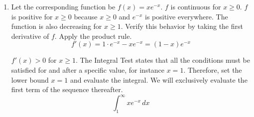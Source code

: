 \documentclass[a4paper, 12pt]{article}
\begin{document}
\begin{enumerate}[leftmargin=*,label=\textbf{\arabic*.}]
Find the antiderivative of $\sec^3t$ with the help of integration by parts.
\begin{align*}
    w=\sec t\,&\rightarrow\, dw = \sec t\tan t \,dt\\
    dz=\sec^2t\,dt\,&\rightarrow\, z = \tan t
\end{align*}
\vspace{-2em}
\begin{align*}
\int\sec^3t\,du&=\tan t\cdot\sec t-\int\tan^2 t\sec t\,dt=\tan t\cdot\sec t-\int\frac{1-\cos^2t}{\cos^3 t}\,dt\\[1em]&=\tan t\cdot\sec t-\int\sec^3t\,dt+\int\sec t\,dt 
\end{align*}

Notice that the integral appears on the right side of the equation. Therefore,
\[\int\sec^3t\,dt=\frac12\cdot\tan t\cdot\sec t+\frac12\cdot\int\sec t\,dt\]

The integral of $\sec t$ with respect to $t$ is
\[\int\sec t\,dt=\ln\left|\tan t+\sec t\right|+c_1,\quad c_1\in\mathbb{R}\]

Recall $u=\tan t$.
\[u=\tan t\implies u^2=\tan^2t=\sec^2t-1\implies \sec t=\sqrt{u^2+1}\]
\begin{align*}S&=2\pi\cdot\frac12\left(\tan t\cdot\sec t+\ln\left|\tan t+\sec t\right|\right)+c=\pi\left[u\cdot\sqrt{u^2+1}+\ln\left|t+\sqrt{u^2+1}\right|\right]_1^{ e}\\[1em]&=\pi\left[\left( e\cdot\sqrt{ e^2+1}+\ln\left| e+\sqrt{ e^2+1}\right|\right)-\left(\sqrt2+\ln\left|1+\sqrt2\right|\right)\right]\\[1em]&=\boxed{\pi\left[ e\cdot\sqrt{ e^2+1}-\sqrt2+\ln\left(\frac{ e+\sqrt{ e^2+1}}{1+\sqrt2}\right)\right]}\end{align*}

\item Let the corresponding function be $f(x)=x e^{-x}$. $f$ is continuous for $x\geq0$. $f$ is positive for $x\geq0$ because $x\geq 0$ and $ e^{-x}$ is positive everywhere. The function is also decreasing for $x\geq1$. Verify this behavior by taking the first derivative of $f$. Apply the product rule.
\[f'(x)=1\cdot e^{-x}-x e^{-x}=(1-x) e^{-x}\]

$f'(x)>0$ for $x\geq1$. The Integral Test states that all the conditions must be satisfied for and after a specific value, for instance $x=1$. Therefore, set the lower bound $x=1$ and evaluate the integral. We will exclusively evaluate the first term of the sequence thereafter.
\[\int_1^{\infty}x e^{-x}\,dx\]


\end{enumerate}
\end{document}

